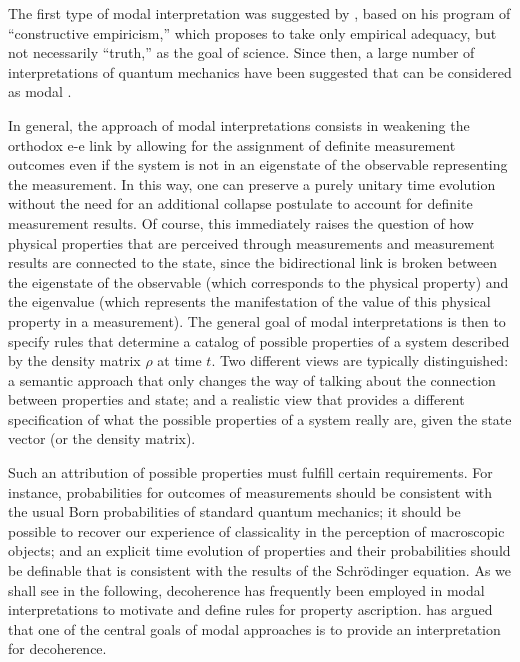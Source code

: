 \documentclass[rmp,aps,amsmath,amsfonts,noshowkeys,noshowpacs,12pt]{revtex4}
\begin{document}
The first type of modal interpretation was suggested by
\citet{Fraassen:1973:yb,Fraassen:1991:ys}, based on his program of
``constructive empiricism,'' which proposes to take only empirical
adequacy, but not necessarily ``truth,'' as the goal of science. Since
then, a large number of interpretations of quantum mechanics have been
suggested that can be considered as modal \citep[for a review and
discussion of some of the basic properties and problems of such
interpretations, see][]{Clifton:1996:op}.

In general, the approach of modal interpretations consists in
weakening the orthodox {e-e} link by allowing for the assignment of
definite measurement outcomes even if the system is not in an
eigenstate of the observable representing the measurement.  In this
way, one can preserve a purely unitary time evolution without the need
for an additional collapse postulate to account for definite
measurement results. Of course, this immediately raises the question
of how physical properties that are perceived through measurements and
measurement results are connected to the state, since the
bidirectional link is broken between the eigenstate of the observable
(which corresponds to the physical property) and the eigenvalue (which
represents the manifestation of the value of this physical property in
a measurement). The general goal of modal interpretations is then to
specify rules that determine a catalog of possible properties of a
system described by the density matrix $\rho$ at time $t$. Two
different views are typically distinguished: a semantic approach that
only changes the way of talking about the connection between
properties and state; and a realistic view that provides a different
specification of what the possible properties of a system really are,
given the state vector (or the density matrix).

Such an attribution of possible properties must fulfill certain
requirements. For instance, probabilities for outcomes of measurements
should be consistent with the usual Born probabilities of standard
quantum mechanics; it should be possible to recover our experience of
classicality in the perception of macroscopic objects; and an explicit
time evolution of properties and their probabilities should be
definable that is consistent with the results of the Schr\"odinger
equation. As we shall see in the following, decoherence has frequently
been employed in modal interpretations to motivate and define rules
for property ascription. \citet{Dieks:1994:oz,Dieks:1994:rc} has
argued that one of the central goals of modal approaches is to provide
an interpretation for decoherence.
\end{document}
